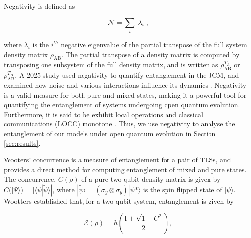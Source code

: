 \documentclass[11pt]{article}
\newcounter{subsubsubsection}[subsubsection]
\begin{document}

Negativity is defined as

\begin{equation} \label{neg_eqn}
    \mathcal{N} = \sum_i |\lambda_i|,
\end{equation}

where $\lambda_i$ is the $i^{th}$ negative eigenvalue of the partial transpose of the full system density matrix $\rho_{\scriptscriptstyle \text{AB}}$. The partial transpose of a density matrix is computed by transposing one subsystem of the full density matrix, and is written as $\rho_{\scriptscriptstyle \text{AB}}^{T_A}$ or $\rho_{\scriptscriptstyle \text{AB}}^{T_B}$. A 2025 study used negativity to quantify entanglement in the JCM, and examined how noise and various interactions influence its dynamics \cite{Entanglement2025-Negativity}. Negativity is a valid measure for both pure and mixed states, making it a powerful tool for quantifying the entanglement of systems undergoing open quantum evolution. Furthermore, it is said to be exhibit local operations and classical communications (LOCC) monotone \cite{Entanglement2009-Definition}. Thus, we use negativity to analyse the entanglement of our models under open quantum evolution in Section \ref{sec:results}. 


Wooters' concurrence is a measure of entanglement for a pair of TLSs, and provides a direct method for computing entanglement of mixed and pure states. The concurrence, $C(\rho)$ of a pure two-qubit density matrix is given by $C(|\Psi\rangle) = |\langle\psi|\tilde{\psi}\rangle|$, where $|\tilde{\psi}\rangle = (\sigma_y\otimes\sigma_y)|\psi*\rangle$ is the spin flipped state of $|\psi\rangle$. Wootters established that, for a two-qubit system, entanglement is given by

\begin{equation}
    \mathcal{E}(\rho) = h\left(\frac{1+\sqrt{1-C^2}}{2}\right),
\end{equation} 
\end{document}
